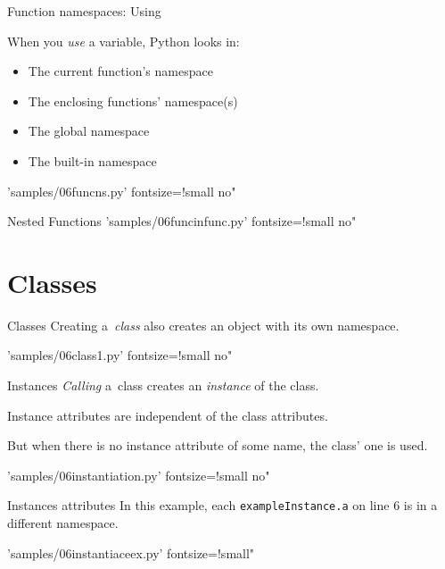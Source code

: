 \documentclass{pyslides}
\begin{document}
\begin{frame}[fragile]{Function namespaces: Using}

When you \emph{use} a variable, Python looks in:
\begin{itemize}
\item The current function's namespace
\item The enclosing functions' namespace(s)
\item The global namespace
\item The built-in namespace
\end{itemize}

\bigskip

 'samples/06funcns.py' fontsize=!small no"
\end{frame}


\begin{frame}[fragile]{Nested Functions}
 'samples/06funcinfunc.py' fontsize=!small no"
\end{frame}

\section{Classes}

\begin{frame}[fragile]{Classes}
Creating a~\emph{class} also creates an object with its own namespace.

\bigskip

 'samples/06class1.py' fontsize=!small no"

\end{frame}

\begin{frame}[fragile]{Instances}
\emph{Calling} a~class creates an \emph{instance} of the class.

Instance attributes are independent of the class attributes.

But when there is no instance attribute of some name, the class' one is used.

\bigskip

 'samples/06instantiation.py' fontsize=!small no"

\end{frame}

\begin{frame}[fragile]{Instances attributes}
In this example, each {\tt exampleInstance.a} on line 6 is in a different namespace.

\bigskip

 'samples/06instantiaceex.py' fontsize=!small"

\end{frame}
\end{document}
